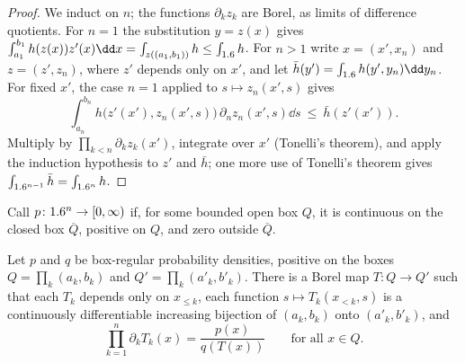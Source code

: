 \begin{refsection}
\begin{proof}
We induct on $n$; the functions $\partial_kz_k$ are Borel, as limits of difference quotients. For $n=1$ the substitution $y=z(x)$ gives $\int_{a_1}^{b_1}h(z(x))z'(x)\dd x=\int_{z((a_1,b_1))}h\le\int_{\R}h$. For $n>1$ write $x=(x',x_n)$ and $z=(z',z_n)$, where $z'$ depends only on $x'$, and let $\bar h(y')=\int_{\R}h(y',y_n)\dd y_n$. For fixed $x'$, the case $n=1$ applied to $s\mapsto z_n(x',s)$ gives
\[
\int_{a_n}^{b_n}h\bigl(z'(x'),z_n(x',s)\bigr)\,\partial_nz_n(x',s)\dd s\ \le\ \bar h(z'(x')).
\]
Multiply by $\prod_{k<n}\partial_kz_k(x')$, integrate over $x'$ (Tonelli's theorem), and apply the induction hypothesis to $z'$ and $\bar h$; one more use of Tonelli's theorem gives $\int_{1.6^{n-1}}\bar h=\int_{1.6^n}h$.
\end{proof}

Call $p\colon1.6^n\to[0,\infty)$  if, for some bounded open box $Q$, it is continuous on the closed box $\overline Q$, positive on $Q$, and zero outside $\overline Q$.

\begin{lemma}\label{lem:transport:knothe}
Let $p$ and $q$ be box-regular probability densities, positive on the boxes $Q=\prod_k(a_k,b_k)$ and $Q'=\prod_k(a'_k,b'_k)$. There is a Borel map $T\colon Q\to Q'$ such that each $T_k$ depends only on $x_{\le k}$, each function $s\mapsto T_k(x_{<k},s)$ is a continuously differentiable increasing bijection of $(a_k,b_k)$ onto $(a'_k,b'_k)$, and
\begin{equation}\label{eq:transport:knothejac}
\prod_{k=1}^n\partial_kT_k(x)=\frac{p(x)}{q(T(x))}\qquad\text{for all }x\in Q.
\end{equation}
\end{lemma}


\end{refsection}
